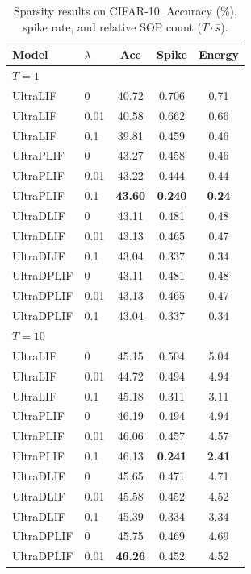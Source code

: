 \documentclass{article}
\theoremstyle{plain}
\theoremstyle{definition}
\theoremstyle{remark}
\begin{document}
\begin{table}[h]
\caption{Sparsity results on CIFAR-10. Accuracy (\%), spike rate, and relative SOP count ($T \cdot \bar{s}$).}
\label{tab:sparsity_cifar10}
\vskip 0.1in
\begin{center}
\begin{small}
\begin{tabular}{llccc}
\toprule
Model & $\lambda$ & Acc & Spike & Energy \\
\midrule
\multicolumn{5}{l}{\textit{$T{=}1$}} \\
UltraLIF   & 0    & 40.72 & 0.706 & 0.71 \\
UltraLIF   & 0.01 & 40.58 & 0.662 & 0.66 \\
UltraLIF   & 0.1  & 39.81 & 0.459 & 0.46 \\
UltraPLIF  & 0    & 43.27 & 0.458 & 0.46 \\
UltraPLIF  & 0.01 & 43.22 & 0.444 & 0.44 \\
UltraPLIF  & 0.1  & \textbf{43.60} & \textbf{0.240} & \textbf{0.24} \\
UltraDLIF  & 0    & 43.11 & 0.481 & 0.48 \\
UltraDLIF  & 0.01 & 43.13 & 0.465 & 0.47 \\
UltraDLIF  & 0.1  & 43.04 & 0.337 & 0.34 \\
UltraDPLIF & 0    & 43.11 & 0.481 & 0.48 \\
UltraDPLIF & 0.01 & 43.13 & 0.465 & 0.47 \\
UltraDPLIF & 0.1  & 43.04 & 0.337 & 0.34 \\
\midrule
\multicolumn{5}{l}{\textit{$T{=}10$}} \\
UltraLIF   & 0    & 45.15 & 0.504 & 5.04 \\
UltraLIF   & 0.01 & 44.72 & 0.494 & 4.94 \\
UltraLIF   & 0.1  & 45.18 & 0.311 & 3.11 \\
UltraPLIF  & 0    & 46.19 & 0.494 & 4.94 \\
UltraPLIF  & 0.01 & 46.06 & 0.457 & 4.57 \\
UltraPLIF  & 0.1  & 46.13 & \textbf{0.241} & \textbf{2.41} \\
UltraDLIF  & 0    & 45.65 & 0.471 & 4.71 \\
UltraDLIF  & 0.01 & 45.58 & 0.452 & 4.52 \\
UltraDLIF  & 0.1  & 45.39 & 0.334 & 3.34 \\
UltraDPLIF & 0    & 45.75 & 0.469 & 4.69 \\
UltraDPLIF & 0.01 & \textbf{46.26} & 0.452 & 4.52 \\

\end{tabular}
\end{small}
\end{center}
\end{table}
\end{document}
